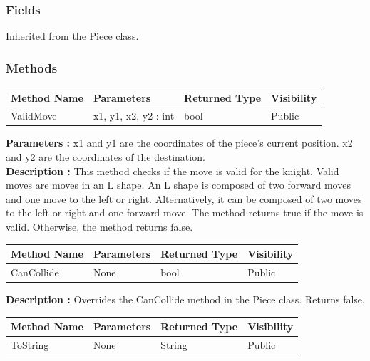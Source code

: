 \documentclass[12pt]{article}
\begin{document}
\subsubsection{Fields}

    Inherited from the Piece class.

\subsubsection{Methods}

\begin{table}[H]
    \begin{tabular}{|l|l|l|l|}
    \hline
    \rowcolor[HTML]{EFEFEF} 
    \cellcolor[HTML]{EFEFEF}\textbf{Method Name} & \textbf{Parameters}  & \textbf{Returned Type} & \textbf{Visibility} \\ \hline
    ValidMove                          & x1, y1, x2, y2 : int & bool                   & Public              \\ \hline
    \end{tabular}
\end{table}

    \textbf{Parameters :} x1 and y1 are the coordinates of the piece's current position.
    x2 and y2 are the coordinates of the destination.  
\\
    \textbf{Description :} This method checks if the move is valid for the knight. 
    Valid moves are moves in an L shape.
    An L shape is composed of two forward moves and one move to the left or right.
    Alternatively, it can be composed of two moves to the left or right and one forward move.
    The method returns true if the move is valid.
    Otherwise, the method returns false.

\begin{table}[H]
    \begin{tabular}{|l|l|l|l|}
    \hline
    \rowcolor[HTML]{EFEFEF} 
    \cellcolor[HTML]{EFEFEF}\textbf{Method Name} & \textbf{Parameters}  & \textbf{Returned Type} & \textbf{Visibility} \\ \hline
    CanCollide                                   & None                 & bool                   & Public              \\ \hline
    \end{tabular}
\end{table}

    \textbf{Description :} Overrides the CanCollide method in the Piece class.
    Returns false.

\begin{table}[H]
    \begin{tabular}{|l|l|l|l|}
    \hline
    \rowcolor[HTML]{EFEFEF} 
    \cellcolor[HTML]{EFEFEF}\textbf{Method Name} & \textbf{Parameters}  & \textbf{Returned Type} & \textbf{Visibility} \\ \hline
    ToString                                   & None                 & String                   & Public              \\ \hline
    \end{tabular}
\end{table}
\end{document}
